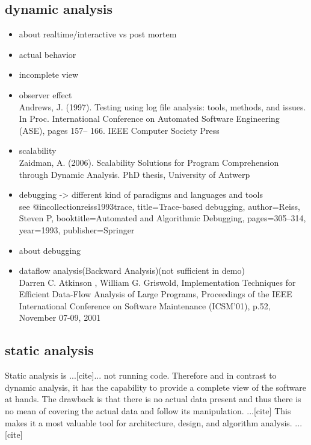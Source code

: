 \subsection{dynamic analysis}

\begin{itemize}
\item about realtime/interactive vs post mortem
\item actual behavior
\item incomplete view \cite{Ball:1999:CDA:318774.318944}
\item observer effect \\
Andrews, J. (1997). Testing using log file analysis: tools, methods, and issues.
In Proc. International Conference on Automated Software Engineering (ASE), pages 157–
166. IEEE Computer Society Press
\item scalability \\
Zaidman, A. (2006). Scalability Solutions for Program Comprehension through Dynamic
Analysis. PhD thesis, University of Antwerp
\item debugging -> different kind of paradigms and languages and tools\\
see @incollection{reiss1993trace,
title={Trace-based debugging},
author={Reiss, Steven P},
booktitle={Automated and Algorithmic Debugging},
pages={305--314},
year={1993},
publisher={Springer}
}
\item about debugging
\item dataflow analysis(Backward Analysis)(not sufficient in demo) \\
	Darren C. Atkinson , William G. Griswold, Implementation Techniques for Efficient Data-Flow Analysis of Large Programs, Proceedings of the IEEE International Conference on Software Maintenance (ICSM'01), p.52, November 07-09, 2001
\end{itemize}

\subsection{static analysis}

Static analysis is ...[cite]... not running code.
Therefore and in contrast to dynamic analysis, it has the capability to provide a complete view of the software at hands. The drawback is that there is no actual data present and thus there is no mean of covering the actual data and follow its manipulation. ...[cite]
This makes it a most valuable tool for architecture, design, and algorithm analysis. ...[cite]

